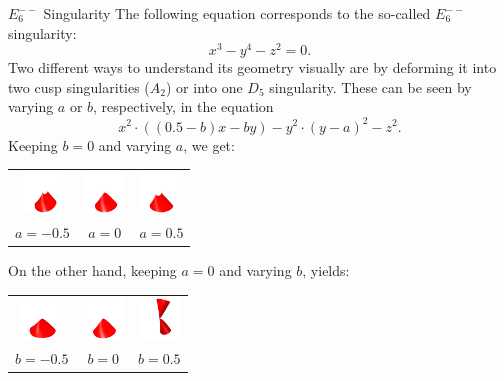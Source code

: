 \begin{surferPage}[E6-- Singularity]{$E_6^{--}$ Singularity}
	The following equation corresponds to the so-called $E_6^{--}$ singularity:
	\[
		x^3-y^4-z^2=0.
	\]
	Two different ways to understand its geometry visually are by deforming it into two cusp singularities ($A_2$) or into one $D_5$ singularity. These can be seen by varying $a$ or $b$, respectively, in the equation
	\[
		x^2\cdot ((0.5-b)x-by)-y^2\cdot(y-a)^2-z^2.
	\]
	Keeping $b=0$ and varying $a$, we get:
	\begin{center}
		\begin{tabular}{@{}c@{\quad}c@{\quad}c@{}}
			\includegraphics[width=1.1cm]{../../common/images/E6mm_1} &
			\includegraphics[width=1.1cm]{../../common/images/E6mm_0} &
			\includegraphics[width=1.1cm]{../../common/images/E6mm_2}\\
			$a=-0.5$ &
			$a=0$ &
			$a=0.5$
		\end{tabular}
	\end{center}
	On the other hand, keeping $a=0$ and varying $b$, yields:
	\begin{center}
		\begin{tabular}{@{}c@{\quad}c@{\quad}c@{}}
			\includegraphics[width=1.1cm]{../../common/images/E6mm_4} &
			\includegraphics[width=1.1cm]{../../common/images/E6mm_0} &
			\includegraphics[width=1.1cm]{../../common/images/E6mm_5}\\
			$b=-0.5$&
			$b=0$&
			$b=0.5$
		\end{tabular}
	\end{center}
\end{surferPage}
